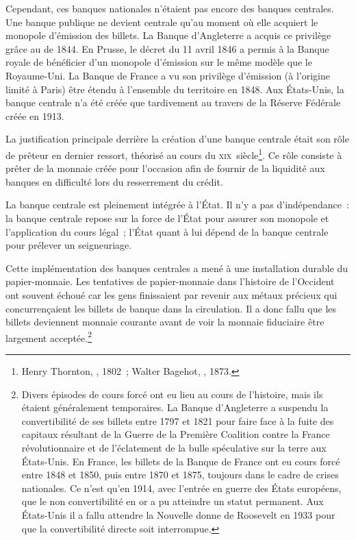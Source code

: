 
Cependant, ces banques nationales n'étaient pas encore des banques centrales. Une banque publique ne devient centrale qu'au moment où elle acquiert le monopole d'émission des billets. La Banque d'Angleterre a acquis ce privilège grâce au  de 1844. En Prusse, le décret du 11 avril 1846 a permis à la Banque royale de bénéficier d'un monopole d'émission sur le même modèle que le Royaume-Uni. La Banque de France a vu son privilège d'émission (à l'origine limité à Paris) être étendu à l'ensemble du territoire en 1848. Aux États-Unis, la banque centrale n'a été créée que tardivement au travers de la Réserve Fédérale créée en 1913.

La justification principale derrière la création d'une banque centrale était son rôle de prêteur en dernier ressort, théorisé au cours du \textsc{xix}\ieme{}~siècle\footnote{Henry Thornton, , 1802~; Walter Bagehot, , 1873.}. Ce rôle consiste à prêter de la monnaie créée pour l'occasion afin de fournir de la liquidité aux banques en difficulté lors du resserrement du crédit.

La banque centrale est pleinement intégrée à l'État. Il n'y a pas d'indépendance~: la banque centrale repose sur la force de l'État pour assurer son monopole et l'application du cours légal~; l'État quant à lui dépend de la banque centrale pour prélever un seigneuriage.

Cette implémentation des banques centrales a mené à une installation durable du papier-monnaie. Les tentatives de papier-monnaie dans l'histoire de l'Occident ont souvent échoué car les gens finissaient par revenir aux métaux précieux qui concurrençaient les billets de banque dans la circulation. Il a donc fallu que les billets deviennent monnaie courante avant de voir la monnaie fiduciaire être largement acceptée.\footnote{Divers épisodes de cours forcé ont eu lieu au cours de l'histoire, mais ils étaient généralement temporaires. La Banque d'Angleterre a suspendu la convertibilité de ses billets entre 1797 et 1821 pour faire face à la fuite des capitaux résultant de la Guerre de la Première Coalition contre la France révolutionnaire et de l'éclatement de la bulle spéculative sur la terre aux États-Unis. En France, les billets de la Banque de France ont eu cours forcé entre 1848 et 1850, puis entre 1870 et 1875, toujours dans le cadre de crises nationales. Ce n'est qu'en 1914, avec l'entrée en guerre des États européens, que le non convertibilité en or a pu atteindre un statut permanent. Aux États-Unis il a fallu attendre la Nouvelle donne de Roosevelt en 1933 pour que la convertibilité directe soit interrompue.}

